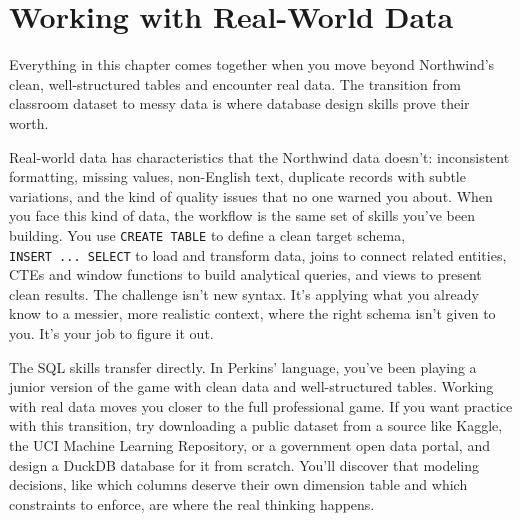 \documentclass[
  letterpaper,
  DIV=11,
  numbers=noendperiod]{scrreprt}
\begin{document}
\section{Working with Real-World
Data}\label{working-with-real-world-data}

Everything in this chapter comes together when you move beyond
Northwind's clean, well-structured tables and encounter real data. The
transition from classroom dataset to messy data is where database design
skills prove their worth.

Real-world data has characteristics that the Northwind data doesn't:
inconsistent formatting, missing values, non-English text, duplicate
records with subtle variations, and the kind of quality issues that no
one warned you about. When you face this kind of data, the workflow is
the same set of skills you've been building. You use
\texttt{CREATE\ TABLE} to define a clean target schema,
\texttt{INSERT\ ...\ SELECT} to load and transform data, joins to
connect related entities, CTEs and window functions to build analytical
queries, and views to present clean results. The challenge isn't new
syntax. It's applying what you already know to a messier, more realistic
context, where the right schema isn't given to you. It's your job to
figure it out.

The SQL skills transfer directly. In Perkins' language, you've been
playing a junior version of the game with clean data and well-structured
tables. Working with real data moves you closer to the full professional
game. If you want practice with this transition, try downloading a
public dataset from a source like Kaggle, the UCI Machine Learning
Repository, or a government open data portal, and design a DuckDB
database for it from scratch. You'll discover that modeling decisions,
like which columns deserve their own dimension table and which
constraints to enforce, are where the real thinking happens.
\end{document}
